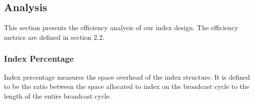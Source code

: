 \documentclass{sig-alternate}
\begin{document}




\subsection{Analysis}

This section presents the efficiency analysis of our index design. The
efficiency metrics are defined in section 2.2.

\subsubsection{Index Percentage}

Index percentage measures the space overhead of the index structure. It
is defined to be the ratio between the space allocated to index on the
broadcast cycle to the length of the entire broadcast cycle.
\end{document}
